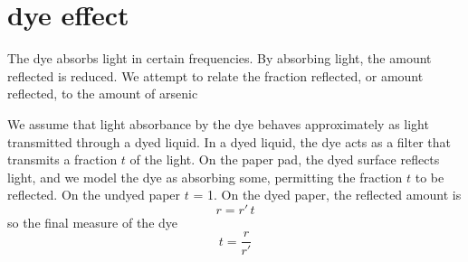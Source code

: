 \documentclass[11pt,letter]{article}
\newcommand{\COMMENT}[1]{}
\begin{document}
\COMMENT{
that models $g$ across the areas of the pad and the reference chip. 
For a pixel at $(i,j)$, we have
\begin{equation} \label{eq:dgofPvarphi}
	g_{(i,j)} = \varphi P_{i,j} %
\end{equation}
where $\varphi$ is some varying factor due to differences in LED brightness and exposure duration.
We anticipate that $P_{i,j}$ should be fixed
because the geometry of the LEDs and the reference gray chip is held invariant after calibration.
This is verified by showing $P$ can be fit satisfactorily  during calibration using a scalar $\varphi$ over different exposure durations.
%
With $P$ known, we write for the pre-image and post-image
\begin{equation} \label{eq:dgofPprepost}
	g'_{(i,j)} = \varphi' P_{i,j} \qquad \ g_{(i,j)} = \varphi P_{i,j} 
\end{equation}
So that 
%
that \eqref{eq:dgofPvarphi} provides a good estimate of $g_{(i,j)}$ using a fixed $P$ and varying $\varphi$ over many photos with varying exposure times.
%
 that the $g_{(i,j)}$ 
and we assume that $P$ measured during calibration and $P$ measured during 
%
 matches the average relative reflectance from the reference gray chips in their fixed locations on the stage, and on the gray chip in the pad location.
The  gray chip level can be estimated at any point on the pad by fitting the polynomial to match the observed reference gray chip levels.
}

\section{dye effect} 

The dye absorbs light in certain frequencies.
By absorbing light, the amount reflected is reduced.
We attempt to relate the fraction reflected, or amount reflected, to the amount of arsenic 

We assume that light absorbance by the dye behaves approximately as light transmitted through a dyed liquid.
In a dyed liquid, the dye acts as a filter that transmits a fraction $t$ of the light.  
On the paper pad, the dyed surface reflects light, and we model the dye as absorbing some, permitting the fraction $t$ to be reflected.  
On the undyed paper $t$ = 1.
On the dyed paper, the reflected amount is 
\begin{equation}
	r  = r' \, t
	\label{eq:dye1}
\end{equation}
so the final measure of the dye
\begin{equation}
	t   = \frac{r}{r'}
	\label{eq:dye2}
\end{equation}
\end{document}
